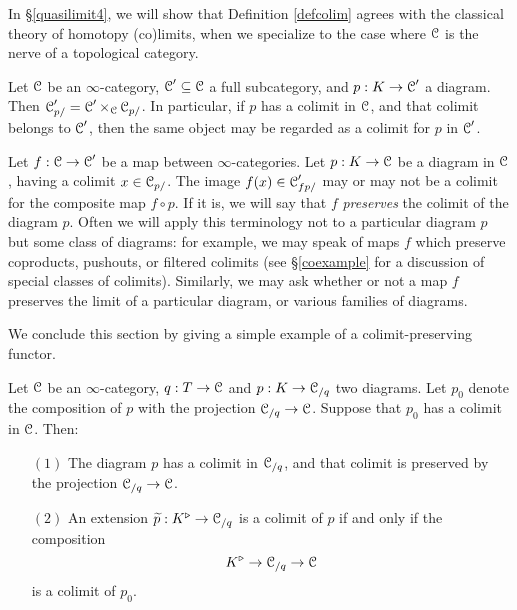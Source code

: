\begin{Didn't Read}
\begin{remark}
In \S \ref{quasilimit4}, we will show
that Definition \ref{defcolim} agrees with the classical theory of homotopy (co)limits, when
we specialize to the case where $\operatorname{\mathcal{C}}$ is the nerve of a topological category.
\end{remark}

\begin{remark}
Let $\operatorname{\mathcal{C}}$ be an $\infty$-category, $\operatorname{\mathcal{C}}' \subseteq \operatorname{\mathcal{C}}$ a full subcategory,
and $p: K \rightarrow \operatorname{\mathcal{C}}'$ a diagram. Then $\operatorname{\mathcal{C}}'_{p/} = \operatorname{\mathcal{C}}' \times_{\operatorname{\mathcal{C}}}
\operatorname{\mathcal{C}}_{p/}$. In particular, if $p$ has a colimit in $\operatorname{\mathcal{C}}$, and that
colimit belongs to $\operatorname{\mathcal{C}}'$, then the same object may be regarded as a
colimit for $p$ in $\operatorname{\mathcal{C}}'$.
\end{remark}

Let $f: \operatorname{\mathcal{C}} \rightarrow \operatorname{\mathcal{C}}'$ be a map between $\infty$-categories. Let $p: K
\rightarrow \operatorname{\mathcal{C}}$ be a diagram in $\operatorname{\mathcal{C}}$, having a colimit $x \in \operatorname{\mathcal{C}}_{p/}$.
The image $f(x) \in \operatorname{\mathcal{C}}'_{f p/}$ may or may not be a colimit for the composite map
$f \circ p$. If it is, we will say that $f$ {\it preserves} the colimit of the diagram $p$.
Often we will apply this terminology not to a particular diagram $p$ but some class of diagrams: for example, we may speak of maps $f$ which
preserve coproducts, pushouts, or filtered colimits (see \S \ref{coexample} for a discussion of special classes of colimits). Similarly, we may ask whether or not a map $f$
preserves the limit of a particular diagram, or various families of diagrams.

We conclude this section by giving a simple example of a colimit-preserving functor.

\begin{proposition}\label{needed17}
Let $\operatorname{\mathcal{C}}$ be an $\infty$-category, $q: T \rightarrow \operatorname{\mathcal{C}}$ and $p: K \rightarrow \operatorname{\mathcal{C}}_{/q}$ two diagrams. Let $p_0$ denote the composition of $p$ with the projection 
$\operatorname{\mathcal{C}}_{/q} \rightarrow \operatorname{\mathcal{C}}$. Suppose that $p_0$ has a colimit in $\operatorname{\mathcal{C}}$. Then:
\begin{itemize}
\item[$(1)$] The diagram $p$ has a colimit in $\operatorname{\mathcal{C}}_{/q}$, and that colimit is preserved by the projection $\operatorname{\mathcal{C}}_{/q} \rightarrow \operatorname{\mathcal{C}}$.

\item[$(2)$] An extension $\widetilde{p}: K^{\triangleright} \rightarrow \operatorname{\mathcal{C}}_{/q}$ is a colimit
of $p$ if and only if the composition
$$K^{\triangleright} \rightarrow \operatorname{\mathcal{C}}_{/q} \rightarrow \operatorname{\mathcal{C}}$$
is a colimit of $p_0$.


\end{itemize}
\end{proposition}
\end{Didn't Read}
